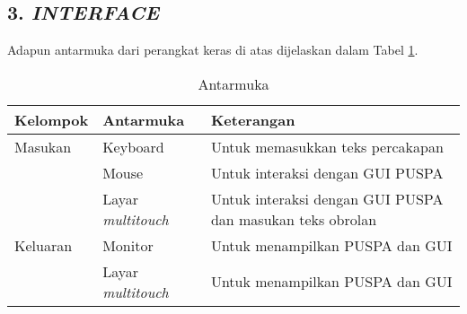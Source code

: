 \subsection*{\textcolor{subsectioncolor}{\textsf{3. \textit{INTERFACE}}}}
Adapun antarmuka dari perangkat keras di atas dijelaskan dalam Tabel \ref{antarmuka}.
\begin{table}
	\centering
		\begin{tabular}{|p{4cm}|p{3.5cm}|p{7cm}|}
			\hline
				Kelompok & Antarmuka & Keterangan\\
			\hline
				Masukan & Keyboard & Untuk memasukkan teks percakapan\\
				& Mouse & Untuk interaksi dengan GUI PUSPA\\
				& Layar \textit{multitouch} & Untuk interaksi dengan GUI PUSPA dan masukan teks obrolan\\
			\hline
				Keluaran & Monitor & Untuk menampilkan PUSPA dan GUI\\
				& Layar \textit{multitouch} & Untuk menampilkan PUSPA dan GUI\\
			\hline
		\end{tabular}
\caption{Antarmuka}
\label{antarmuka}
\end{table}
